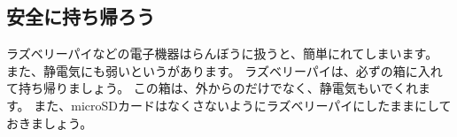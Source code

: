 \documentclass[text01.tex]{subfiles}
\begin{document}
%
%
\subsection{安全に持ち帰ろう}

ラズベリーパイなどの電子機器はらんぼうに扱うと、簡単にれてしまいます。
また、静電気にも弱いというがあります。
ラズベリーパイは、必ずの箱に入れて持ち帰りましょう。
この箱は、外からのだけでなく、静電気もいでくれます。
また、microSDカードはなくさないようにラズベリーパイにしたままにしておきましょう。


\clearpage
\end{document}
